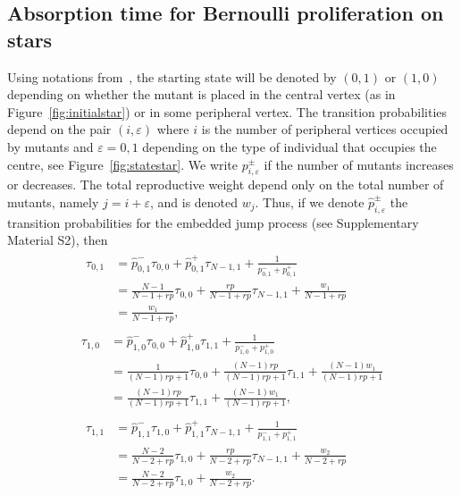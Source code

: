\documentclass[a4paper,english,10pt]{amsart}
\theoremstyle{definition}
\numberwithin{equation}{section}
\begin{document}
\subsection{Absorption time for Bernoulli proliferation on stars}

Using notations from~\cite{AGSL}, the starting state will be denoted by $(0,1)$ or $(1,0)$ depending on whether the mutant is placed in the central vertex (as in Figure~\ref{fig:initialstar}) or in some peripheral 
vertex. The transition probabilities depend on the pair $(i,\varepsilon)$ where $i$ is the number of peripheral vertices occupied by mutants and $\varepsilon = 0,1$ depending on the type of individual that occupies the centre, see Figure~\ref{fig:statestar}. We write $p^\pm_{i,\varepsilon}$  if the number of mutants increases or decreases. The total reproductive weight depend only on the total number of mutants, namely $j = i+\varepsilon$, and is denoted $w_j$. 
Thus, if we denote 
$\hat p^\pm_{i,\varepsilon}$ 
the transition probabilities for the embedded jump process (see Supplementary Material S2), then
\begin{align} \label{eq:star_11}
\begin{split}
  \tau_{0,1} &= \hat p_{0,1}^- \tau_{0,0} 
                  + \hat p_{0,1}^+ \tau_{N-1,1} + 
			\frac{1}{p_{0,1}^- +p_{0,1}^+}    \\ 
             & = \frac{N-1}{N-1+rp}\tau_{0,0} 
                  + \frac{rp}{N-1+rp}\tau_{N-1,1} + \frac{w_1}{N-1+rp} \phantom{xxxX} \\
             & = \frac{w_1}{N-1+rp}, 
\end{split}
\end{align}
\begin{align} \label{eq:star_12}
\begin{split}
\tau_{1,0} &= \hat p_{1,0}^- \tau_{0,0} 
                  + \hat p_{1,0}^+ \tau_{1,1} +  
	\frac{1}{p_{1,0}^- +p_{1,0}^+}  \\ 
             &= \frac{1}{(N-1)rp+1} \tau_{0,0} 
                  + \frac{(N-1)rp}{(N-1)rp+1}\tau_{1,1} + 
\frac{(N-1)w_1}{(N-1)rp+1}  \\
  &= \frac{(N-1)rp}{(N-1)rp+1}\tau_{1,1} + 
\frac{(N-1)w_1}{(N-1)rp+1}, 
\end{split}
\end{align}
\begin{align} \label{eq:star_13}
\begin{split}
\tau_{1,1} &= \hat p_{1,1}^- \tau_{1,0} + \hat p_{1,1}^+ \tau_{N-1,1}+ \frac{1}{p_{1,1}^- +p_{1,1}^+}  \\    
 &= \frac{N-2}{N-2+ rp} \tau_{1,0} 
                 + \frac{rp}{N-2+ rp}\tau_{N-1,1} + \frac{w_2}{N-2+rp}   \phantom{xxxX} \\
       &= \frac{N-2}{N-2+ rp} \tau_{1,0} + \frac{w_2}{N-2+rp}. 
\end{split}
\end{align}
\end{document}
